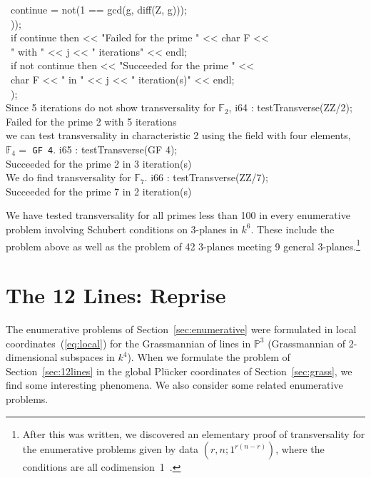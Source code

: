 \                 continue = not(1 == gcd(g, diff(Z, g)));\\
\                 ));\\
\            if continue then << "Failed for the prime " << char F << \\
\               " with " << j << " iterations" << endl;\\
\            if not continue then << "Succeeded for the prime " <<\\
\                char F << " in " << j << " iteration(s)" << endl;\\
\            );\\
\endOutput
%
Since 5 iterations do not show transversality for ${\mathbb F}_2$,
%
\beginOutput
i64 : testTransverse(ZZ/2);\\
Failed for the prime 2 with 5 iterations\\
\endOutput
%
we can test transversality in characteristic 2 using the field with
four elements, ${\mathbb F}_4=$ {\tt GF 4}.
%
\beginOutput
i65 : testTransverse(GF 4);\\
Succeeded for the prime 2 in 3 iteration(s)\\
\endOutput
%
We do find transversality for ${\mathbb F}_7$.
%
\beginOutput
i66 : testTransverse(ZZ/7);\\
Succeeded for the prime 7 in 2 iteration(s)\\
\endOutput

We have tested transversality for all primes less than 100 in every
enumerative problem involving Schubert conditions on 3-planes in $k^6$.
These include the problem above as well as the problem of 42 3-planes meeting
9 general 3-planes.\footnote{After this was written, we discovered an
elementary proof of transversality for the enumerative problems given by data 
$(r,n;1^{r(n-r)})$, where the conditions are all
codimension~1~\cite{SO:So_trans}.}


\section{The 12 Lines: Reprise}
The enumerative problems of Section~\ref{sec:enumerative} were formulated
in local coordinates~(\ref{eq:local}) for the Grassmannian of lines in
${\mathbb P}^3$ (Grassmannian of 2-dimensional subspaces in $k^4$).
When we formulate the problem of Section~\ref{sec:12lines} in the global
Pl\"ucker coordinates of Section~\ref{sec:grass},
we find some interesting phenomena.
We also consider some related enumerative problems.

